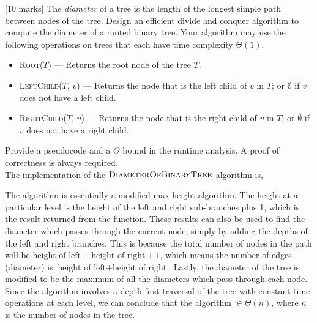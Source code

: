 {[10 marks]} The {\it diameter} of a tree is the length of the longest simple path
between nodes of the tree. Design an efficient divide and conquer algorithm to compute the diameter of a rooted binary tree. Your algorithm may use the following operations on trees that each have time complexity $\Theta(1)$.
\begin{itemize}
    \item \textsc{Root}($T$) --- Returns the root node of the tree $T$.
    \item \textsc{LeftChild}($T$, $v$) --- Returns the node that is the left child of $v$ in $T$; or $\emptyset$ if $v$ does not have a left child.
    \item \textsc{RightChild}($T$, $v$) --- Returns the node that is the right child of $v$ in $T$; or $\emptyset$ if $v$ does not have a right child.
\end{itemize}

Provide a pseudocode and a $\Theta$ bound in the runtime analysis. A proof of correctness is always required.
\\

The implementation of the $\textsc{DiameterOfBinaryTree}$ algorithm is,

\leavevmode\newline
The algorithm is essentially a modified max height algorithm. The height at a particular level is
the height of the left and right sub-branches plus 1, which is the result returned from the function.
These results can also be used to find the diameter which passes through the current node, simply by
adding the depths of the left and right branches. This is because the total number of nodes in the path
will be $\text{height of left} + \text{height of right} + 1$, which means the number of edges (diameter) is
$\text{height of left} + \text{height of right}$. Lastly, the diameter of the tree is modified to be
the maximum of all the diameters which pass through each node. \\

Since the algorithm involves a depth-first traversal of the tree with constant time operations at each
level, we can conclude that the algorithm $\in \Theta\left(n\right)$, where $n$ is the number of nodes
in the tree.